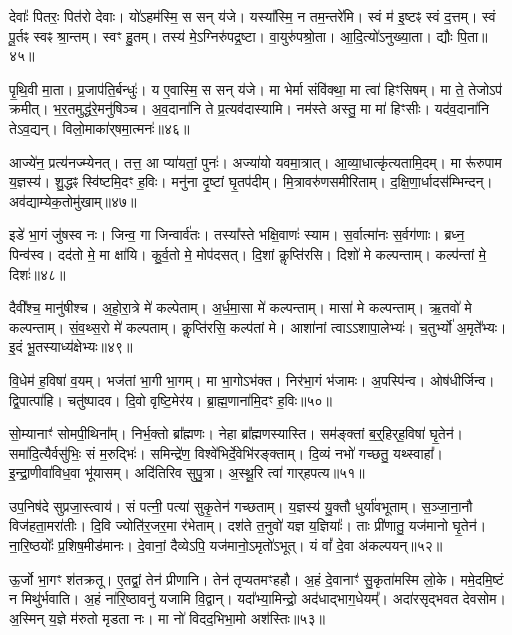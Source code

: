 देवाः᳚ पितरः॒ पित॑रो देवाः।
यो॑ऽहम॑स्मि॒ स सन् य॑जे।
यस्या᳚स्मि॒ न तम॒न्तरे॑मि।
स्वं म॑ इ॒ष्टꣴ स्वं द॒त्तम्।
स्वं पू॒र्तꣴ स्वꣴ श्रा॒न्तम्।
स्वꣳ हु॒तम्।
तस्य॑ मे॒\-ऽग्निरु॑पद्र॒ष्टा।
वा॒युरु॑पश्रो॒ता।
आ॒दि॒त्यो॑\-ऽनुख्या॒ता।
द्यौः पि॒ता॥४५॥\ip

पृ॒थि॒वी मा॒ता।
प्र॒जा\-प॑ति॒र्बन्धुः॑।
य ए॒वास्मि॒ स सन् य॑जे।
मा भेर्मा संवि॑क्था॒ मा त्वा॑ हिꣳसिषम्।
मा ते॒ तेजोऽप॑ क्रमीत्।
भ॒र॒तमुद्ध॑रे॒मनु॑षिञ्च।
अ॒व॒दाना॑नि ते प्र॒त्यव॑दास्यामि।
नम॑स्ते अस्तु॒ मा मा॑ हिꣳसीः।
यद॑व॒दाना॑नि तेऽव॒द्यन्।
विलो॒माका॑र्‌\mbox{}षमा॒त्मनः॑॥४६॥\ip

आज्ये॑न॒ प्रत्य॑नज्म्येनत्।
तत्त॒ आ प्या॑यतां॒ पुनः॑।
अज्या॑यो यवमा॒त्रात्।
आ॒व्या॒धात्कृ॑त्यतामि॒दम्।
मा रू॑रुपाम य॒ज्ञस्य॑।
शु॒द्धꣴ स्वि॑ष्टमि॒दꣳ ह॒विः।
मनु॑ना दृ॒ष्टां घृ॒तप॑दीम्।
मि॒त्रावरु॑णसमीरिताम्।
द॒क्षि॒णा॒र्धादस॑म्भिन्दन्।
अव॑द्याम्ये\-क॒तोमु॑खाम्॥४७॥\ip

इडे॑ भा॒गं जु॑षस्व नः।
जिन्व॒ गा जिन्वार्व॑तः।
तस्या᳚स्ते भक्षि॒वाणः॑ स्याम।
स॒र्वात्मा॑नः स॒र्वग॑णाः।
ब्रध्न॒ पिन्व॑स्व।
दद॑तो मे॒ मा क्षा॑यि।
कु॒र्व॒तो मे॒ मोप॑दसत्।
दि॒शां कॢप्ति॑रसि।
दिशो॑ मे कल्पन्ताम्।
कल्प॑न्तां मे॒ दिशः॑॥४८॥\ip

दैवी᳚श्च॒ मानु॑षीश्च।
अ॒हो॒रा॒त्रे मे॑ कल्पेताम्।
अ॒र्ध॒मा॒सा मे॑ कल्पन्ताम्।
मासा॑ मे कल्पन्ताम्।
ऋ॒तवो॑ मे कल्पन्ताम्।
सं॒व॒थ्स॒रो मे॑ कल्पताम्।
कॢप्ति॑रसि॒ कल्प॑तां मे।
आशा॑नां त्वा\-ऽऽशापा॒लेभ्यः॑।
च॒तुर्भ्यो॑ अ॒मृते᳚भ्यः।
इ॒दं भू॒तस्याध्य॑क्षेभ्यः॥४९॥\ip

वि॒धेम॑ ह॒विषा॑ व॒यम्।
भज॑तां भा॒गी भा॒गम्।
मा भा॒गो\-ऽभ॑क्त।
निर॑भा॒गं भ॑जामः।
अ॒पस्पि॑न्व।
ओष॑धीर्जिन्व।
द्वि॒पात्पा॑हि।
चतु॑ष्पादव।
दि॒वो वृष्टि॒मेर॑य।
ब्रा॒ह्म॒णाना॑मि॒दꣳ ह॒विः॥५०॥\ip

सो॒म्यानाꣳ॑ सोमपी॒थिना᳚म्।
निर्भ॒क्तो ब्रा᳚ह्मणः।
नेहा ब्रा᳚ह्मणस्यास्ति।
सम॑ङ्क्तां ब॒र्॒हिर्‌\mbox{}ह॒विषा॑ घृ॒तेन॑।
समा॑दि॒त्यैर्वसु॑भिः॒ सं म॒रुद्भिः॑।
समिन्द्रे॑ण॒ विश्वे॑भिर्दे॒वेभि॑रङ्क्ताम्।
दि॒व्यं नभो॑ गच्छतु॒ यथ्स्वाहा᳚।
इ॒न्द्रा॒णीवा॑विध॒वा भू॑यासम्।
अदि॑तिरिव सुपु॒त्रा।
अ॒स्थू॒रि त्वा॑ गार्‌\mbox{}हपत्य॥५१॥\ip

उप॒निष॑दे सुप्रजा॒स्त्वाय॑।
सं पत्नी॒ पत्या॑ सुकृ॒तेन॑ गच्छताम्।
य॒ज्ञस्य॑ यु॒क्तौ धुर्या॑वभूताम्।
स॒ञ्जा॒ना॒नौ विज॑हता॒मरा॑तीः।
दि॒वि ज्योति॑र॒जर॒मा र॑भेताम्।
दश॑ते त॒नुवो॑ यज्ञ य॒ज्ञियाः᳚।
ताः प्री॑णातु॒ यज॑मानो घृ॒तेन॑।
ना॒रि॒ष्ठयोः᳚ प्र॒शिष॒मीड॑मानः।
दे॒वानां॒ दैव्येऽपि॒ यज॑मानो॒\-ऽमृतो॑\-ऽभूत्।
यं वां᳚ दे॒वा अ॑कल्पयन्॥५२॥\ip

ऊ॒र्जो भा॒गꣳ श॑तक्रतू।
ए॒तद्वां॒ तेन॑ प्रीणानि।
तेन॑ तृप्यतमꣳहहौ।
अ॒हं दे॒वानाꣳ॑ सु॒कृता॑मस्मि लो॒के।
ममे॒दमि॒ष्टं न मिथु॑र्भवाति।
अ॒हं ना॑रि॒ष्ठावनु॑ यजामि वि॒द्वान्।
यदा᳚भ्या॒मिन्द्रो॒ अद॑धाद्भाग॒धेयम्᳚।
अदा॑रसृद्भवत देवसोम।
अ॒स्मिन् य॒ज्ञे म॑रुतो मृडता नः।
मा नो॑ विदद॒भिभा॒मो अश॑स्तिः॥५३॥\ip

